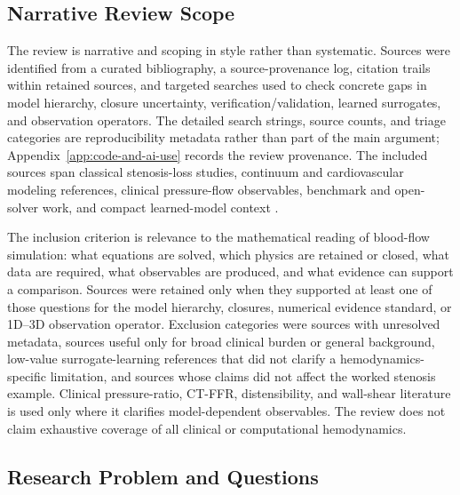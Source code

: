 \subsection{Narrative Review Scope}
\label{subsec:narrative-review-scope}

The review is narrative and scoping in style rather than systematic. Sources
were identified from a curated bibliography, a source-provenance log, citation
trails within retained sources, and targeted searches used to check concrete
gaps in model hierarchy, closure uncertainty, verification/validation, learned
surrogates, and observation operators. The detailed search strings, source
counts, and triage categories are reproducibility metadata rather than part of
the main argument; Appendix~\ref{app:code-and-ai-use} records the review
provenance. The included sources span classical stenosis-loss studies, continuum
and cardiovascular modeling references, clinical pressure-flow observables,
benchmark and open-solver work, and compact learned-model context
\cite{YoungTsai1973SteadyStenosis,YoungTsai1973UnsteadyStenosis,GaldiEtAl2008HemodynamicalFlows,
QuarteroniFormaggia2004CardiovascularModeling,FormaggiaEtAl2003OneDimensionalBloodFlow,
ShiEtAl2011BloodFlowModelReview,BoileauEtAl2015Benchmark,BenemeritoEtAl2024OpenBF,
CanicEtAl2024Extended1DStenosis,ToninoEtAl2010FAMEAngioFunctional,
Blanco2018FFR1D3D,YuEtAl2026PINNHemodynamicsReview}.

The inclusion criterion is relevance to the mathematical reading of blood-flow
simulation: what equations are solved, which physics are retained or closed,
what data are required, what observables are produced, and what evidence can
support a comparison. Sources were retained only when they supported at least
one of those questions for the model hierarchy, closures, numerical evidence
standard, or 1D--3D observation operator. Exclusion categories were sources with
unresolved metadata, sources useful only for broad clinical burden or general
background, low-value surrogate-learning references that did not clarify a
hemodynamics-specific limitation, and sources whose claims did not affect the
worked stenosis example. Clinical pressure-ratio, CT-FFR, distensibility, and
wall-shear literature is used only where it clarifies model-dependent
observables. The review does not claim exhaustive coverage of all clinical or
computational hemodynamics.

\subsection{Research Problem and Questions}
\label{subsec:research-problem-questions}

